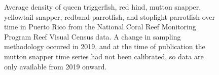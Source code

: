 \documentclass[
  letterpaper,
  oneside,
  open=any]{scrbook}
\begin{document}
\begin{figure}


\caption{\label{fig-RVCPR}Average density of queen triggerfish, red
hind, mutton snapper, yellowtail snapper, redband parrotfish, and
stoplight parrotfish over time in Puerto Rico from the National Coral
Reef Monitoring Program Reef Visual Census data. A change in sampling
methodology occured in 2019, and at the time of publication the mutton
snapper time series had not been calibrated, so data are only available
from 2019 onward.}

\end{figure}%
\end{document}
